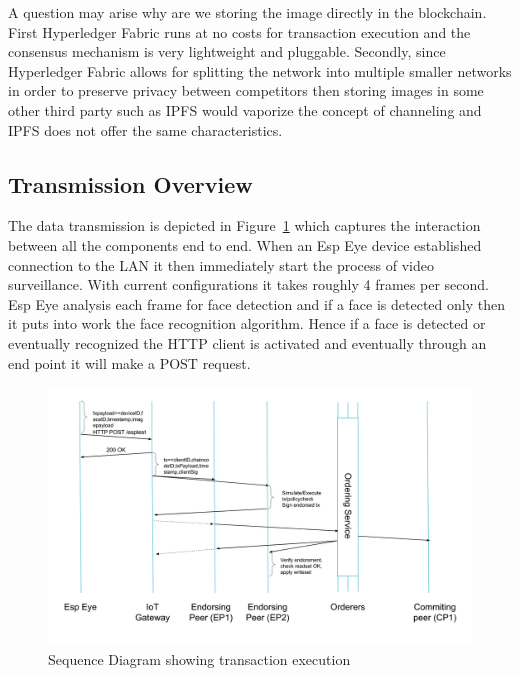 A question may arise why are we storing the image directly in the blockchain. First Hyperledger Fabric runs at no costs for transaction execution and the consensus mechanism is very lightweight and pluggable. Secondly, since Hyperledger Fabric allows for splitting the network into multiple smaller networks in order to preserve privacy between competitors then storing images in some other third party such as IPFS would vaporize the concept of channeling and IPFS does not offer the same characteristics. 


\subsection{Transmission Overview}

The data transmission is depicted in Figure~\ref{fig:seqdiag} which captures the interaction between all the components end to end. When an Esp Eye device established connection to the LAN it then immediately start the process of video surveillance. With current configurations it takes roughly 4 frames per second. Esp Eye analysis each frame for face detection and if a face is detected only then it puts into work the face recognition algorithm. Hence if a face is detected or eventually recognized the HTTP client is activated and eventually through an end point it will make a POST request. 






\begin{figure}[!htb]
    \centering
    \includegraphics[width=1\textwidth]{figures/sequencediagram1.png}
    \caption{Sequence Diagram showing transaction execution}
    \label{fig:seqdiag}
\end{figure}





